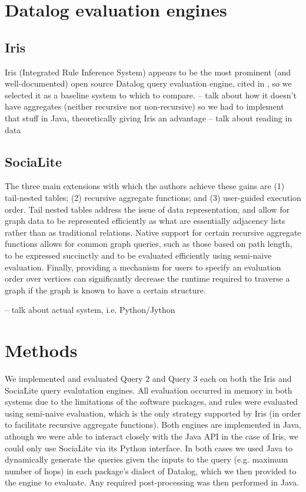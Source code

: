 \documentclass{article}
\begin{document}
\begin{multicols}{2}
\section{Datalog evaluation engines}

\subsection{Iris}

Iris (Integrated Rule Inference System) appears to be the most prominent (and well-documented) open source Datalog query evaluation engine, cited in \cite{seo-et-al-13a}, so we selected it as a baseline system to which to compare.
-- talk about how it doesn't have aggregates (neither recursive nor non-recursive) so we had to implement that stuff in Java, theoretically giving Iris an advantage
-- talk about reading in data

\subsection{SociaLite}

The three main extensions with which the authors achieve these gains are (1) tail-nested tables; (2) recursive aggregate functions; and (3) user-guided execution order. Tail nested tables address the issue of data representation, and allow for graph data to be represented efficiently as what are essentially adjacency lists rather than as traditional relations. Native support for certain recursive aggregate functions allows for common graph queries, such as those based on path length, to be expressed succinctly and to be evaluated efficiently using semi-naive evaluation. Finally, providing a mechanism for users to specify an evaluation order over vertices can significantly decrease the runtime required to traverse a graph if the graph is known to have a certain structure.

-- talk about actual system, i.e. Python/Jython

\section{Methods}

We implemented and evaluated Query 2 and Query 3 each on both the Iris and SociaLite query evalutation engines. All evaluation occurred in memory in both systems due to the limitations of the software packages, and rules were evaluated using semi-naive evaluation, which is the only strategy supported by Iris (in order to facilitate recursive aggregate functions). Both engines are implemented in Java, athough we were able to interact closely with the Java API in the case of Iris, we could only use SociaLite via its Python interface. In both cases we used Java to dynamically generate the queries given the inputs to the query (e.g. maximum number of hops) in each package's dialect of Datalog, which we then provided to the engine to evaluate. Any required post-processing was then performed in Java.


\end{multicols}
\end{document}
